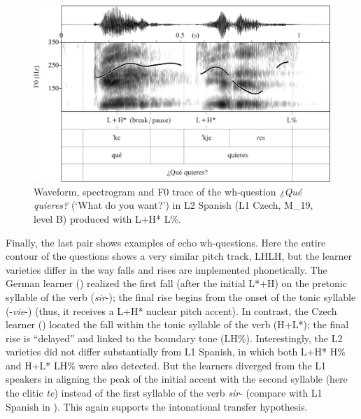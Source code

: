 \begin{figure}


\includegraphics[width=\textwidth]{figures/Figure_4.122.png}



\caption{Waveform, spectrogram and F0 trace of the wh-question \textit{¿Qué quieres?} (‘What do you want?’) in L2 Spanish (L1 Czech, M\_19, level B) produced with L+H* L\%.}
\label{fig:4.122}
\end{figure}

Finally, the last pair shows examples of echo wh-questions. Here the entire contour of the questions shows a very similar pitch track, LHLH, but the learner varieties differ in the way falls and rises are implemented phonetically. The German learner () realized the first fall (after the initial L*+H) on the pretonic syllable of the verb (\textit{sir}{}-); the final rise begins from the onset of the tonic syllable (-\textit{vie}{}-) (thus, it receives a L+H* nuclear pitch accent). In contrast, the Czech learner () located the fall within the tonic syllable of the verb (H+L*); the final rise is “delayed” and linked to the boundary tone (LH\%). Interestingly, the L2 varieties did not differ substantially from L1 Spanish, in which both L+H* H\% and H+L* LH\% were also detected. But the learners diverged from the L1 speakers in aligning the peak of the initial accent with the second syllable (here the clitic \textit{te}) instead of the first syllable of the verb \textit{sir}{}- (compare with L1 Spanish in ). This again supports the intonational transfer hypothesis.

